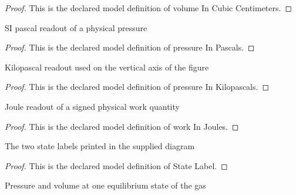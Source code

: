 \begin{proof}
  This is the declared model definition of volume In Cubic Centimeters.
\end{proof}
\begin{definition}
  \label{def:physics:phyx-mini-0403:phyxminiproblems-problemphyxmini0403-pressureinpascals}
  SI pascal readout of a physical pressure
\end{definition}
\begin{proof}
  This is the declared model definition of pressure In Pascals.
\end{proof}
\begin{definition}
  \label{def:physics:phyx-mini-0403:phyxminiproblems-problemphyxmini0403-pressureinkilopascals}
  Kilopascal readout used on the vertical axis of the figure
\end{definition}
\begin{proof}
  This is the declared model definition of pressure In Kilopascals.
\end{proof}
\begin{definition}
  \label{def:physics:phyx-mini-0403:phyxminiproblems-problemphyxmini0403-workinjoules}
  Joule readout of a signed physical work quantity
\end{definition}
\begin{proof}
  This is the declared model definition of work In Joules.
\end{proof}
\begin{definition}
  \label{def:physics:phyx-mini-0403:phyxminiproblems-problemphyxmini0403-statelabel}
  The two state labels printed in the supplied diagram
\end{definition}
\begin{proof}
  This is the declared model definition of State Label.
\end{proof}
\begin{definition}
  \label{def:physics:phyx-mini-0403:phyxminiproblems-problemphyxmini0403-thermodynamicstate}
  Pressure and volume at one equilibrium state of the gas
\end{definition}
